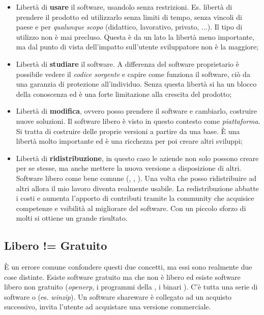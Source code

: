 \begin{itemize}

\item Libertà di \textbf{usare} il software, usandolo senza restrizioni. Es. libertà di prendere il prodotto ed utilizzarlo senza limiti di tempo, senza vincoli di paese e per \textit{qualunque scopo} (didattico, lavorativo, privato, ...). Il tipo di utilizzo non è mai precluso. Questa è da un lato la libertà meno importante, ma dal punto di vista dell'impatto sull'utente sviluppatore non è la maggiore;
\item Libertà di \textbf{studiare} il software. A differenza del software proprietario è possibile vedere il \textit{codice sorgente} e capire come funziona il software, ciò da una garanzia di protezione all'individuo. Senza questa libertà si ha un blocco della conoscenza ed è una forte limitazione alla crescita del prodotto;
\item Libertà di \textbf{modifica}, ovvero posso prendere il software e cambiarlo, costruire nuove soluzioni. Il software libero è visto in questo contesto come \textit{piattaforma}. Si tratta di costruire delle proprie versioni a partire da una base. È una libertà molto importante ed è una ricchezza per poi creare altri sviluppi;
\item Libertà di \textbf{ridistribuzione}, in questo caso le aziende non solo possono creare per se stesse, ma anche mettere la nuova versione a disposizione di altri. Software libero come bene comune (, , ). Una volta che posso ridistribuire ad altri allora il mio lavoro diventa realmente usabile. La redistribuzione abbatte i costi e aumenta l'apporto di contributi tramite la community che acquisice competenze e vsibilità al migliorare del software. Con un piccolo sforzo di molti si ottiene un grande risultato.

\end{itemize}

\subsection{Libero != Gratuito}

È un errore comune confondere questi due concetti, ma essi sono realmente due cose distinte. Esiste software gratuito ma che non è libero ed esiste software libero non gratuito (\textit{openerp}, i programmi della , i binari ). C'è tutta una serie di software  o  (es. \textit{winzip}). Un software shareware è collegato ad un acquisto successivo, invita l'utente ad acquistare una versione commerciale.

